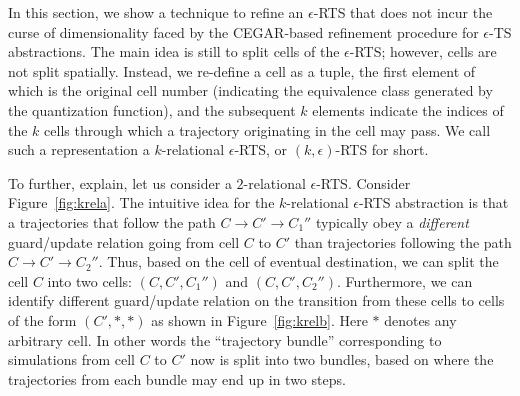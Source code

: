 % 
% 
% 

In this section, we show a technique to refine an $\epsilon$-RTS that
does not incur the curse of dimensionality faced by the CEGAR-based
refinement procedure for $\epsilon$-TS abstractions. The main idea is
still to split cells of the $\epsilon$-RTS; however, cells are not
split spatially.  Instead, we re-define a cell as a tuple, the first
element of which is the original cell number (indicating the
equivalence class generated by the quantization function), and the
subsequent $k$ elements indicate the indices of the $k$ cells through
which a trajectory originating in the cell may pass. We call such a
representation a $k$-relational $\epsilon$-RTS, or $(k,\epsilon)$-RTS
for short. 

To further, explain, let us consider a $2$-relational $\epsilon$-RTS.
Consider Figure~\ref{fig:krela}. The intuitive idea for the
$k$-relational $\epsilon$-RTS abstraction is that a trajectories that
follow the path $C \rightarrow C' \rightarrow C_1''$ typically obey a
{\em different} guard/update relation going from cell $C$ to $C'$ than
trajectories following the path $C \rightarrow C' \rightarrow C_2''$.
Thus, based on the cell of eventual destination, we can split the cell
$C$ into two cells: $(C,C',C_1'')$ and $(C,C',C_2'')$. Furthermore, we
can identify different guard/update relation on the transition from
these cells to cells of the form $(C',*,*)$ as shown in
Figure~\ref{fig:krelb}. Here $*$ denotes any arbitrary cell. In other
words the ``trajectory bundle'' corresponding to simulations from cell
$C$ to $C'$ now is split into two bundles, based on where the
trajectories from each bundle may end up in two steps.

